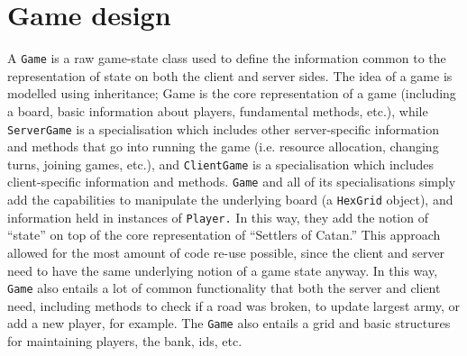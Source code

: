 \documentclass[a4paper,doc]{apa6}
\newcommand{\code}{\texttt}
\begin{document}
\section{Game design}
A \code{Game} is a raw game-state class used to define the information common to the representation of state on both the client and server sides. The idea of a game is modelled using inheritance; Game is the core representation of a game (including a board, basic information about players, fundamental methods, etc.), while \code{ServerGame} is a specialisation which includes other server-specific information and methods that go into running the game (i.e. resource allocation, changing turns, joining games, etc.), and \code{ClientGame} is a specialisation which includes client-specific information and methods. \code{Game} and all of its specialisations simply add the capabilities to manipulate the underlying board (a \code{HexGrid} object), and information held in instances of \code{Player.} In this way, they add the notion of “state” on top of the core representation of “Settlers of Catan.” This approach allowed for the most amount of code re-use possible, since the client and server need to have the same underlying notion of a game state anyway. In this way, \code{Game} also entails a lot of common functionality that both the server and client need, including methods to check if a road was broken, to update largest army, or add a new player, for example. The \code{Game} also entails a grid and basic structures for maintaining players, the bank, ids, etc.
\end{document}
